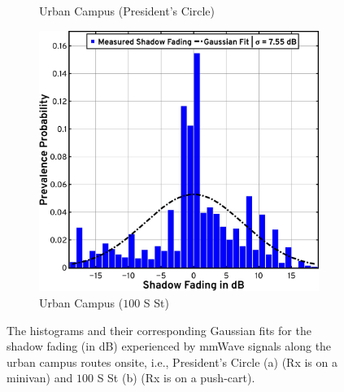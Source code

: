 \documentclass[12pt, draftcls, onecolumn]{IEEEtran}
\begin{document}
{\begin{figure} [t]
\begin{subfigure}{0.4965\linewidth}
        \caption{Urban Campus (President's Circle)}
        \label{F9a}
    \end{subfigure}
    \begin{subfigure}{0.4935\linewidth}
        \centering
        \includegraphics[width=1.0\linewidth]{figs/urban_campus_shadow_fading_2.pdf}
        \caption{Urban Campus ($100$ S St)}
        \label{F9b}
    \end{subfigure}
    \vspace{-8mm}
    \caption{The histograms and their corresponding Gaussian fits for the shadow fading (in dB) experienced by mmWave signals along the urban campus routes onsite, i.e., President's Circle (a) (Rx is on a minivan) and $100$ S St (b) (Rx is on a push-cart).}
    \label{F9}
\end{figure}

}
\end{document}
